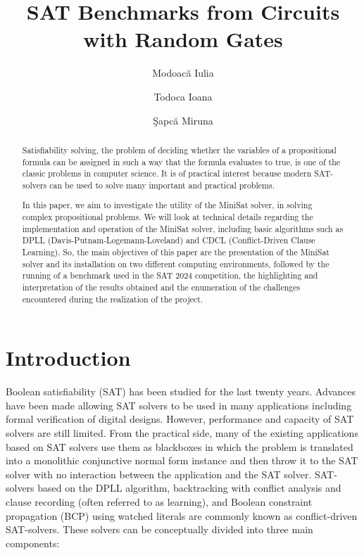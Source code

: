 \documentclass[runningheads]{llncs}
\begin{document}
%
\title{SAT Benchmarks from Circuits with Random Gates}
%
%
\author{Modoac\u a Iulia \and
Todoca Ioana \and
\c Sapc\u a Miruna}
%
%
%
\maketitle              %
%
\begin{abstract}
Satisfiability solving, the problem of deciding
whether the variables of a propositional formula can be assigned in such a way that the formula evaluates to true, is one of the classic problems in computer science.  It is
of practical interest because modern SAT-solvers can be used to
solve many important and practical problems.

In this paper, we aim to investigate the utility of the MiniSat solver, in solving complex propositional problems. We will look at technical details regarding the implementation and operation of the MiniSat solver, including basic algorithms such as DPLL (Davis-Putnam-Logemann-Loveland) and CDCL (Conflict-Driven Clause Learning). So, the main objectives of this paper are the presentation of the MiniSat solver and its installation on two different computing environments, followed by the running of a benchmark used in the SAT 2024 competition, the highlighting and interpretation of the results obtained and the enumeration of the challenges encountered during the realization of the project.

\end{abstract}
%
%
%
\section{Introduction}

Boolean satisfiability (SAT) has been studied for the last twenty years. Advances have been made allowing SAT solvers to be used in many applications including formal
verification of digital designs. However, performance and capacity of SAT solvers are still limited. From the practical side, many of the existing applications based on SAT solvers use them as blackboxes in which the problem is translated into a monolithic conjunctive normal form instance and then throw it to the SAT solver with no interaction between the application and the SAT solver. SAT-solvers based on the DPLL algorithm, backtracking with conflict analysis and clause recording (often referred to as learning), and Boolean constraint propagation (BCP) using watched literals are commonly known as conflict-driven SAT-solvers. These solvers can be conceptually divided into three main components:
\end{document}

